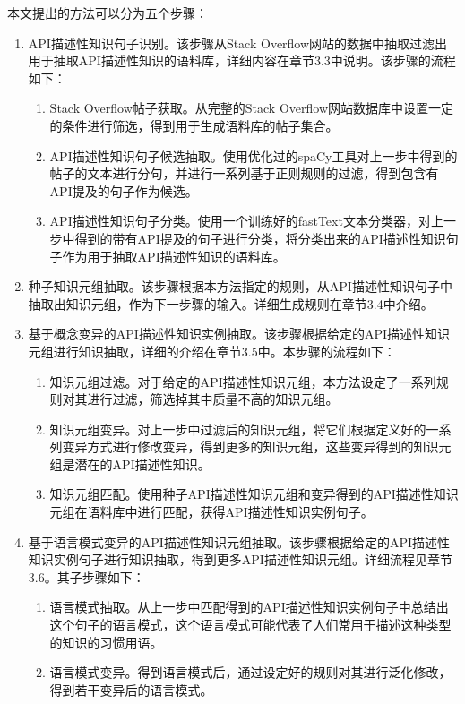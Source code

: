 本文提出的方法可以分为五个步骤：
\begin{enumerate}
    \item API描述性知识句子识别。该步骤从Stack Overflow网站的数据中抽取过滤出用于抽取API描述性知识的语料库，详细内容在章节3.3中说明。该步骤的流程如下：
    \begin{enumerate}
        \item Stack Overflow帖子获取。从完整的Stack Overflow网站数据库中设置一定的条件进行筛选，得到用于生成语料库的帖子集合。
        \item API描述性知识句子候选抽取。使用优化过的spaCy工具对上一步中得到的帖子的文本进行分句，并进行一系列基于正则规则的过滤，得到包含有API提及的句子作为候选。
        \item API描述性知识句子分类。使用一个训练好的fastText文本分类器，对上一步中得到的带有API提及的句子进行分类，将分类出来的API描述性知识句子作为用于抽取API描述性知识的语料库。
    \end{enumerate}
    \item 种子知识元组抽取。该步骤根据本方法指定的规则，从API描述性知识句子中抽取出知识元组，作为下一步骤的输入。详细生成规则在章节3.4中介绍。
    \item 基于概念变异的API描述性知识实例抽取。该步骤根据给定的API描述性知识元组进行知识抽取，详细的介绍在章节3.5中。本步骤的流程如下：
    \begin{enumerate}
        \item 知识元组过滤。对于给定的API描述性知识元组，本方法设定了一系列规则对其进行过滤，筛选掉其中质量不高的知识元组。
        \item 知识元组变异。对上一步中过滤后的知识元组，将它们根据定义好的一系列变异方式进行修改变异，得到更多的知识元组，这些变异得到的知识元组是潜在的API描述性知识。
        \item 知识元组匹配。使用种子API描述性知识元组和变异得到的API描述性知识元组在语料库中进行匹配，获得API描述性知识实例句子。    
    \end{enumerate}
    \item 基于语言模式变异的API描述性知识元组抽取。该步骤根据给定的API描述性知识实例句子进行知识抽取，得到更多API描述性知识元组。详细流程见章节3.6。其子步骤如下：
    \begin{enumerate}
        \item 语言模式抽取。从上一步中匹配得到的API描述性知识实例句子中总结出这个句子的语言模式，这个语言模式可能代表了人们常用于描述这种类型的知识的习惯用语。
        \item 语言模式变异。得到语言模式后，通过设定好的规则对其进行泛化修改，得到若干变异后的语言模式。

\end{enumerate}
\end{enumerate}
